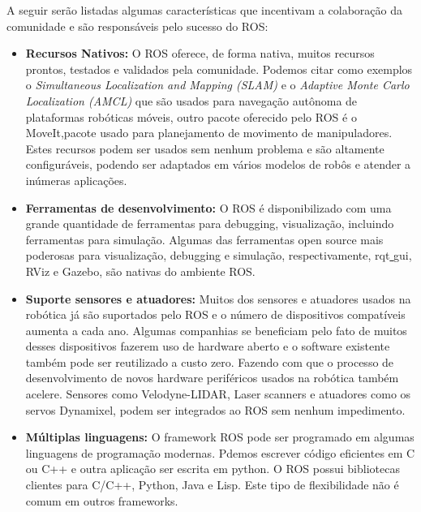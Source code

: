 A seguir serão listadas algumas características que incentivam a colaboração da comunidade e são responsáveis pelo sucesso do ROS\@:

\begin{itemize}
    \item\textbf{Recursos Nativos:} O ROS oferece, de forma nativa, muitos recursos prontos, testados e validados pela comunidade. Podemos citar como exemplos o \textit{Simultaneous Localization and Mapping (SLAM)} e o \textit{Adaptive Monte Carlo Localization (AMCL)} que são usados para navegação autônoma de plataformas robóticas móveis, outro pacote oferecido pelo ROS é o MoveIt,pacote usado para planejamento de movimento de manipuladores. Estes recursos podem ser usados sem nenhum problema e são altamente configuráveis, podendo ser adaptados em vários modelos de robôs e atender a inúmeras aplicações. 

    \item\textbf{Ferramentas de desenvolvimento:} O ROS é disponibilizado com uma grande quantidade de ferramentas para debugging, visualização, incluindo ferramentas para simulação. Algumas das ferramentas open source mais poderosas para visualização, debugging e  simulação, respectivamente, rqt\underline{ }gui, RViz e Gazebo, são nativas do ambiente ROS\@.
    
    \item\textbf{Suporte sensores e atuadores:} Muitos dos sensores e atuadores usados na robótica já são suportados pelo ROS e o número de dispositivos compatíveis aumenta a cada ano. Algumas companhias se beneficiam pelo fato de muitos desses dispositivos fazerem uso de hardware aberto e o software existente também pode ser reutilizado a custo zero. Fazendo com que o processo de desenvolvimento de novos hardware periféricos usados na robótica também acelere. Sensores como Velodyne-LIDAR, Laser scanners e atuadores como os servos Dynamixel, podem ser integrados ao ROS sem nenhum impedimento.
    
    \item\textbf{Múltiplas linguagens:} O framework ROS pode ser programado em algumas linguagens de programação modernas. Pdemos escrever código eficientes em C ou C++ e outra aplicação ser escrita em python. O ROS possui bibliotecas clientes para C/C++, Python, Java e Lisp. Este tipo de flexibilidade não é comum em outros frameworks.
    
\end{itemize}


